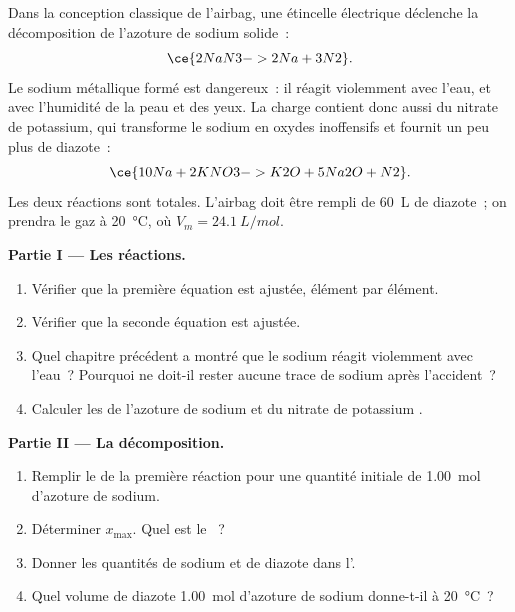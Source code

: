 \begin{problem}
\label{pb:g10:reaction-progress-table:1}
Dans la conception classique de l'airbag, une étincelle électrique
déclenche la décomposition de l'azoture de sodium solide~:
\[
  \ce{2NaN3 -> 2Na + 3N2} .
\]
Le sodium métallique formé est dangereux~: il réagit violemment avec
l'eau, et avec l'humidité de la peau et des yeux. La charge contient donc
aussi du nitrate de potassium, qui transforme le sodium en oxydes
inoffensifs et fournit un peu plus de diazote~:
\[
  \ce{10Na + 2KNO3 -> K2O + 5Na2O + N2} .
\]
Les deux réactions sont totales. L'airbag doit être rempli de
\qty{60}{L} de diazote~; on prendra le gaz à \qty{20}{\celsius}, où
$V_m = \qty{24.1}{L/mol}$.

\medskip
\noindent\textbf{Partie I --- Les réactions.}
\begin{enumerate}
  \item Vérifier que la première équation est ajustée, élément par
        élément.
  \item Vérifier que la seconde équation est ajustée.
  \item Quel chapitre précédent a montré que le sodium réagit violemment
        avec l'eau~? Pourquoi ne doit-il rester aucune trace de sodium
        après l'accident~?
  \item Calculer les  de l'azoture de sodium  et
        du nitrate de potassium .
\end{enumerate}

\medskip
\noindent\textbf{Partie II --- La décomposition.}
\begin{enumerate}[resume]
  \item Remplir le  de la première réaction pour une
        quantité initiale de \qty{1.00}{mol} d'azoture de sodium.
  \item Déterminer $x_{\max}$. Quel est le ~?
  \item Donner les quantités de sodium et de diazote dans l'.
  \item Quel volume de diazote \qty{1.00}{mol} d'azoture de sodium
        donne-t-il à \qty{20}{\celsius}~?
\end{enumerate}


\end{problem}
